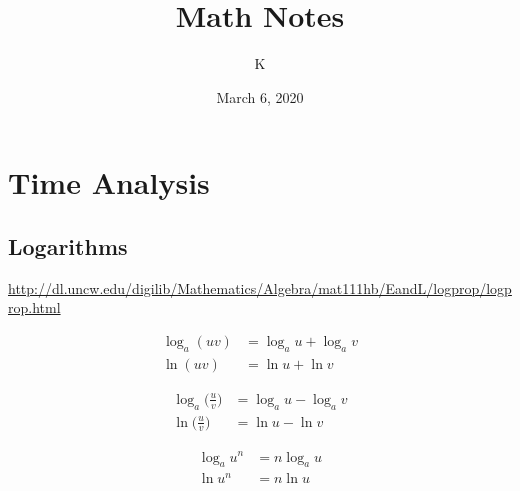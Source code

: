 \documentclass[12pt, letterpaper]{article}
\title{Math Notes}
\author{K}
\date{March 6, 2020}
\begin{document}
\maketitle
\tableofcontents{}
\pagebreak

\section{Time Analysis}
\subsection{Logarithms}
\url{http://dl.uncw.edu/digilib/Mathematics/Algebra/mat111hb/EandL/logprop/logprop.html}

\begin{align*}
  \log_a(uv) &= \log_a u + \log_a v\\
  \ln(uv) &= \ln u + \ln v
\end{align*}

\begin{align*}
  \log_a \Big( \frac{u}{v} \Big) &= \log_a u - \log_a v\\
  \ln \Big( \frac{u}{v} \Big) &= \ln u - \ln v
\end{align*}

\begin{align*}
  \log_a u^n &= n \log_a u\\
  \ln u^n &= n \ln u
\end{align*}
\end{document}
